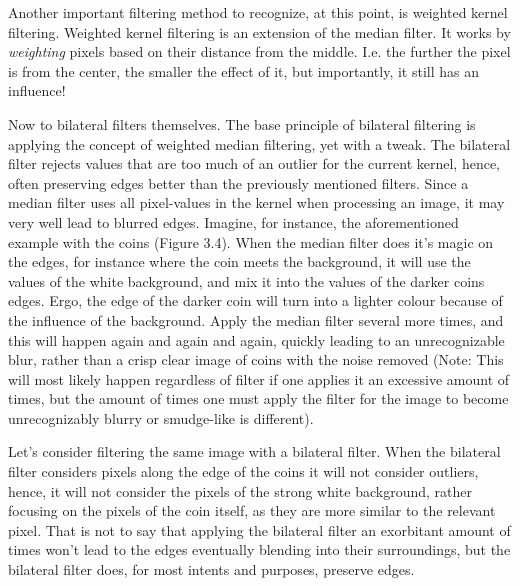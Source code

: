 \documentclass[twoside,a4paper,article]{combine}
\begin{document}
Another important filtering method to recognize, at this point, is weighted kernel filtering. Weighted kernel filtering is an extension of the median filter. It works by \textit{weighting} pixels based on their distance from the middle. I.e. the further the pixel is from the center, the smaller the effect of it, but importantly, it still has an influence!

Now to bilateral filters themselves. The base principle of bilateral filtering is applying the concept of weighted median filtering, yet with a tweak. The bilateral filter rejects values that are too much of an outlier for the current kernel, hence, often preserving edges better than the previously mentioned filters. Since a median filter uses all pixel-values in the kernel when processing an image, it may very well lead to blurred edges. Imagine, for instance, the aforementioned example with the coins (Figure 3.4). When the median filter does it's magic on the edges, for instance where the coin meets the background, it will use the values of the white background, and mix it into the values of the darker coins edges. Ergo, the edge of the darker coin will turn into a lighter colour because of the influence of the background. Apply the median filter several more times, and this will happen again and again and again, quickly leading to an unrecognizable blur, rather than a crisp clear image of coins with the noise removed (Note: This will most likely happen regardless of filter if one applies it an excessive amount of times, but the amount of times one must apply the filter for the image to become unrecognizably blurry or smudge-like is different).

Let's consider filtering the same image with a bilateral filter. When the bilateral filter considers pixels along the edge of the coins it will not consider outliers, hence, it will not consider the pixels of the strong white background, rather focusing on the pixels of the coin itself, as they are more similar to the relevant pixel. That is not to say that applying the bilateral filter an exorbitant amount of times won't lead to the edges eventually blending into their surroundings, but the bilateral filter does, for most intents and purposes, preserve edges.
\end{document}
